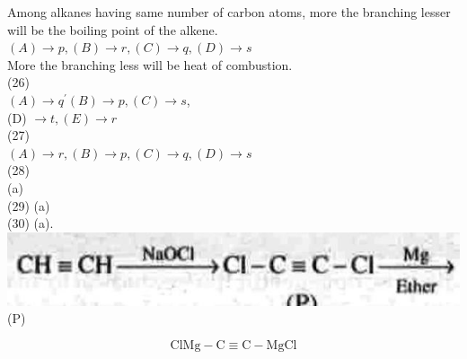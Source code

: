 \documentclass[10pt]{article}
\begin{document}
Among alkanes having same number of carbon atoms, more the branching lesser will be the boiling point of the alkene.\\
$(A) \rightarrow p,(B) \rightarrow r,(C) \rightarrow q,(D) \rightarrow s$\\
More the branching less will be heat of combustion.\\
(26)\\
$(A) \rightarrow q^{\prime}(B) \rightarrow p,(C) \rightarrow s$,\\
(D) $\rightarrow t,(E) \rightarrow r$\\
(27)\\
$(A) \rightarrow r,(B) \rightarrow p,(C) \rightarrow q,(D) \rightarrow s$\\
(28)\\
(a)\\
(29) (a)\\
(30) (a).\\
\includegraphics[max width=\textwidth, center]{2025_01_28_8470952b98110cec3aabg-246(3)}\\
(P)

$$
\mathrm{ClMg}-\mathrm{C} \equiv \mathrm{C}-\mathrm{MgCl}
$$
\end{document}
